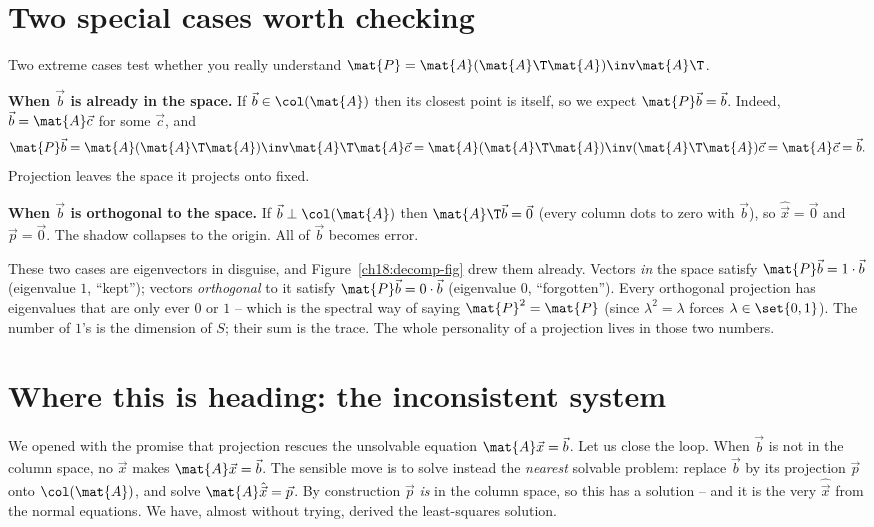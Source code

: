\section{Two special cases worth checking}

Two extreme cases test whether you really understand $\mat{P}=\mat{A}(\mat{A}\T\mat{A})\inv\mat{A}\T$.

\textbf{When $\vec{b}$ is already in the space.} If $\vec{b}\in\col(\mat{A})$ then its closest point
is itself, so we expect $\mat{P}\vec{b}=\vec{b}$. Indeed, $\vec{b}=\mat{A}\vec{c}$ for some
$\vec{c}$, and
\[
  \mat{P}\vec{b} = \mat{A}(\mat{A}\T\mat{A})\inv\mat{A}\T\mat{A}\vec{c}
  = \mat{A}(\mat{A}\T\mat{A})\inv(\mat{A}\T\mat{A})\vec{c}
  = \mat{A}\vec{c} = \vec{b}.
\]
Projection leaves the space it projects onto fixed.

\textbf{When $\vec{b}$ is orthogonal to the space.} If $\vec{b}\perp\col(\mat{A})$ then
$\mat{A}\T\vec{b}=\vec{0}$ (every column dots to zero with $\vec{b}$), so $\hat{\vec{x}}=\vec{0}$
and $\vec{p}=\vec{0}$. The shadow collapses to the origin. All of $\vec{b}$ becomes error.

\begin{aestheticbox}
These two cases are eigenvectors in disguise, and Figure~\ref{ch18:decomp-fig} drew them already.
Vectors \emph{in} the space satisfy
$\mat{P}\vec{b}=1\cdot\vec{b}$ (eigenvalue $1$, ``kept''); vectors \emph{orthogonal} to it satisfy
$\mat{P}\vec{b}=0\cdot\vec{b}$ (eigenvalue $0$, ``forgotten''). Every orthogonal projection has
eigenvalues that are only ever $0$ or $1$ -- which is the spectral way of saying $\mat{P}^2=\mat{P}$
(since $\lambda^2=\lambda$ forces $\lambda\in\set{0,1}$). The number of $1$'s is the dimension of
$S$; their sum is the trace. The whole personality of a projection lives in those two numbers.
\end{aestheticbox}

\section{Where this is heading: the inconsistent system}

We opened with the promise that projection rescues the unsolvable equation $\mat{A}\vec{x}=\vec{b}$.
Let us close the loop. When $\vec{b}$ is not in the column space, no $\vec{x}$ makes
$\mat{A}\vec{x}=\vec{b}$. The sensible move is to solve instead the \emph{nearest} solvable problem:
replace $\vec{b}$ by its projection $\vec{p}$ onto $\col(\mat{A})$, and solve $\mat{A}\hat{\vec{x}}
=\vec{p}$. By construction $\vec{p}$ \emph{is} in the column space, so this has a solution -- and it
is the very $\hat{\vec{x}}$ from the normal equations. We have, almost without trying, derived the
least-squares solution.


